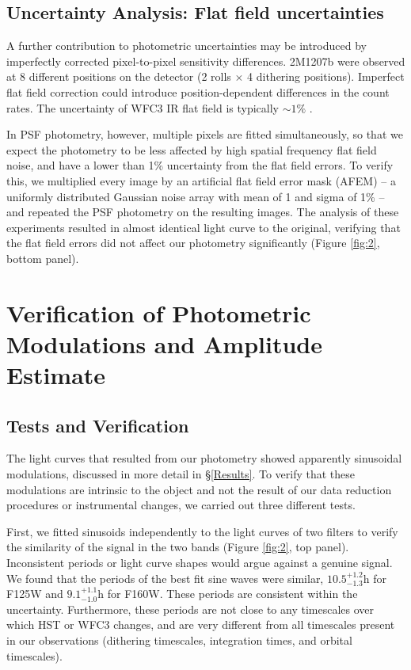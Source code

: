 \documentclass[apj]{emulateapj}
\begin{document}
\subsection{Uncertainty Analysis: Flat field uncertainties}


A further contribution to photometric uncertainties may be introduced
by imperfectly corrected pixel-to-pixel sensitivity
differences. 2M1207b were observed at 8 different positions on the
detector (2 rolls $\times$ 4 dithering positions). Imperfect flat
field correction could introduce position-dependent
differences in the count rates. The uncertainty of WFC3 IR flat field
is typically $\sim 1\%$ \citep{dressel2012wide}.

In PSF photometry, however, multiple pixels are fitted simultaneously,
so that we expect the photometry to be less affected by high spatial frequency flat field
noise, and have a lower than 1\% uncertainty from the flat field
errors. To verify this, we multiplied every image by an artificial flat
field error mask (AFEM) -- a uniformly distributed Gaussian noise array with
mean of 1 and sigma of 1\% -- and repeated the PSF photometry on the
resulting images.  The analysis of these experiments resulted in almost
identical light curve to the original, verifying that the flat field
errors did not affect our photometry significantly (Figure
\ref{fig:2}, bottom panel).


\section{Verification of Photometric Modulations and Amplitude
  Estimate}



\subsection{Tests and Verification}

The light curves that resulted from our photometry showed apparently
sinusoidal modulations, discussed in more detail in
\S\ref{Results}. To verify that these modulations are intrinsic to
the object and not the result of our data reduction procedures or 
instrumental changes, we carried out three different tests.

First, we fitted sinusoids independently to the light curves of two
filters to verify the similarity of the signal in the two bands
(Figure \ref{fig:2}, top panel). Inconsistent periods or light curve
shapes would argue against a genuine signal.  We found that the periods
of the best fit sine waves were similar, $10.5^{+1.2}_{-1.3}$h for
F125W and $9.1^{+1.1}_{-1.0}$h for F160W. These periods are consistent
within the uncertainty. Furthermore, these periods are not close to
any timescales over which HST or WFC3 changes, and are
very different from all timescales present in our observations
(dithering timescales, integration times, and orbital timescales).
\end{document}
